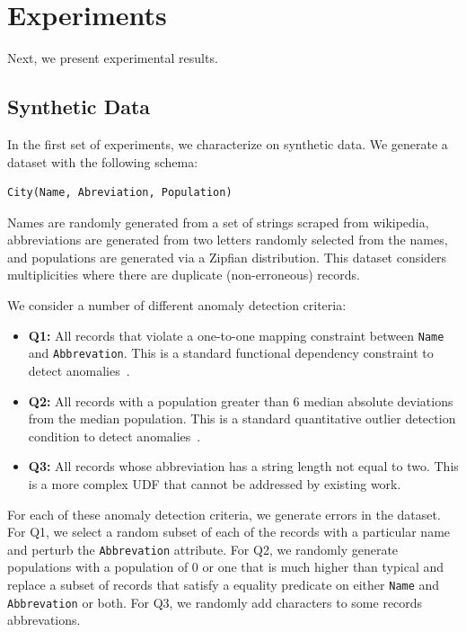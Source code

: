 



\section{Experiments}\label{s:exp}
Next, we present experimental results. 

\subsection{Synthetic Data}
In the first set of experiments, we characterize \sys on synthetic data. We generate a dataset with the following schema:
\begin{lstlisting}
City(Name, Abreviation, Population)
\end{lstlisting}
Names are randomly generated from a set of strings scraped from wikipedia, abbreviations are generated from two letters randomly selected from the names, and populations are generated via a Zipfian distribution. This dataset considers multiplicities where there are duplicate (non-erroneous) records.

We consider a number of different anomaly detection criteria:
\begin{itemize}
    \item \textbf{Q1: } All records that violate a one-to-one mapping constraint between \texttt{Name} and \texttt{Abbrevation}. This is a standard functional dependency constraint to detect anomalies~\cite{DBLP:conf/sigmod/ChalamallaIOP14}.
    \item \textbf{Q2: } All records with a population greater than 6 median absolute deviations from the median population. This is a standard quantitative outlier detection condition to detect anomalies~\cite{bailis2016macrobase,scorpion}. 
    \item \textbf{Q3: } All records whose abbreviation has a string length not equal to two. This is a more complex UDF that cannot be addressed by existing work.
\end{itemize}
For each of these anomaly detection criteria, we generate errors in the dataset. For Q1, we select a random subset of each of the records with a particular name and perturb the \texttt{Abbrevation} attribute. For Q2, we randomly generate populations with a population of 0 or one that is much higher than typical and replace a subset of records that satisfy a equality predicate on either \texttt{Name} and \texttt{Abbrevation} or both.
For Q3, we randomly add characters to some records abbrevations.

